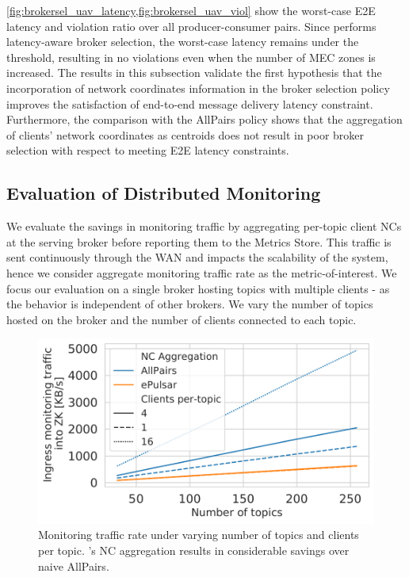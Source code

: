 \cref{fig:brokersel_uav_latency,fig:brokersel_uav_viol} show the worst-case E2E latency and violation ratio over all producer-consumer pairs. Since \epulsar{} performs latency-aware broker selection, the worst-case latency remains under the threshold, resulting in no violations even when the number of MEC zones is increased. 
The results in this subsection validate the first hypothesis that the incorporation of network coordinates information in the broker selection policy improves the satisfaction of end-to-end message delivery latency constraint. Furthermore, the comparison with the AllPairs policy shows that the aggregation of clients' network coordinates as centroids does not result in poor broker selection with respect to meeting E2E latency constraints.

\subsection{Evaluation of Distributed Monitoring}
We evaluate the savings in monitoring traffic by aggregating per-topic client NCs at the serving broker before reporting them to the Metrics Store. This traffic is sent continuously through the WAN and impacts the scalability of the system, hence we consider aggregate monitoring traffic rate as the metric-of-interest. We focus our evaluation on a single broker hosting topics with multiple clients - as the behavior is independent of other brokers. We vary the number of topics hosted on the broker and the number of clients connected to each topic.
\begin{figure}[ht]
  \centering
  \includegraphics[width=0.9\linewidth]{figures/epulsar/evals/zk_traffic_rate__.pdf}  
  \caption{Monitoring traffic rate under varying number of topics and clients per topic. \epulsar's NC aggregation results in considerable savings over naive AllPairs.}
    \label{fig:zk_traffic_rate}
\end{figure}

